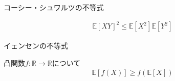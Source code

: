 \documentclass[lualatex,handout]{beamer}
\newcommand{\expt}[1]{\mathbb{E}\left[#1\right]}
\theoremstyle{definition}
\begin{document}
\begin{frame}{コーシー・シュワルツの不等式}
\begin{theorem}
\begin{align*}
\expt{XY}^2 \le \expt{X^2}\expt{Y^2}
\end{align*}
\end{theorem}
\end{frame}

\begin{frame}{イェンセンの不等式}
\begin{theorem}
凸関数$f\colon\mathbb{R}\to\mathbb{R}$について
\begin{align*}
\expt{f(X)} \ge f(\expt{X})
\end{align*}
\end{theorem}

\end{frame}
\end{document}
